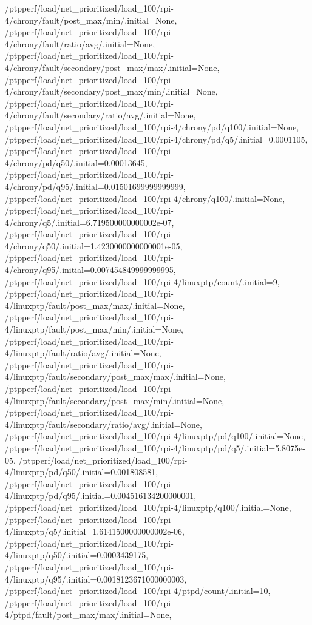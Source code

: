 {    /ptpperf/load/net_prioritized/load_100/rpi-4/chrony/fault/post_max/min/.initial=None,
    /ptpperf/load/net_prioritized/load_100/rpi-4/chrony/fault/ratio/avg/.initial=None,
    /ptpperf/load/net_prioritized/load_100/rpi-4/chrony/fault/secondary/post_max/max/.initial=None,
    /ptpperf/load/net_prioritized/load_100/rpi-4/chrony/fault/secondary/post_max/min/.initial=None,
    /ptpperf/load/net_prioritized/load_100/rpi-4/chrony/fault/secondary/ratio/avg/.initial=None,
    /ptpperf/load/net_prioritized/load_100/rpi-4/chrony/pd/q100/.initial=None,
    /ptpperf/load/net_prioritized/load_100/rpi-4/chrony/pd/q5/.initial=0.0001105,
    /ptpperf/load/net_prioritized/load_100/rpi-4/chrony/pd/q50/.initial=0.00013645,
    /ptpperf/load/net_prioritized/load_100/rpi-4/chrony/pd/q95/.initial=0.01501699999999999,
    /ptpperf/load/net_prioritized/load_100/rpi-4/chrony/q100/.initial=None,
    /ptpperf/load/net_prioritized/load_100/rpi-4/chrony/q5/.initial=6.719500000000002e-07,
    /ptpperf/load/net_prioritized/load_100/rpi-4/chrony/q50/.initial=1.4230000000000001e-05,
    /ptpperf/load/net_prioritized/load_100/rpi-4/chrony/q95/.initial=0.007454849999999995,
    /ptpperf/load/net_prioritized/load_100/rpi-4/linuxptp/count/.initial=9,
    /ptpperf/load/net_prioritized/load_100/rpi-4/linuxptp/fault/post_max/max/.initial=None,
    /ptpperf/load/net_prioritized/load_100/rpi-4/linuxptp/fault/post_max/min/.initial=None,
    /ptpperf/load/net_prioritized/load_100/rpi-4/linuxptp/fault/ratio/avg/.initial=None,
    /ptpperf/load/net_prioritized/load_100/rpi-4/linuxptp/fault/secondary/post_max/max/.initial=None,
    /ptpperf/load/net_prioritized/load_100/rpi-4/linuxptp/fault/secondary/post_max/min/.initial=None,
    /ptpperf/load/net_prioritized/load_100/rpi-4/linuxptp/fault/secondary/ratio/avg/.initial=None,
    /ptpperf/load/net_prioritized/load_100/rpi-4/linuxptp/pd/q100/.initial=None,
    /ptpperf/load/net_prioritized/load_100/rpi-4/linuxptp/pd/q5/.initial=5.8075e-05,
    /ptpperf/load/net_prioritized/load_100/rpi-4/linuxptp/pd/q50/.initial=0.001808581,
    /ptpperf/load/net_prioritized/load_100/rpi-4/linuxptp/pd/q95/.initial=0.004516134200000001,
    /ptpperf/load/net_prioritized/load_100/rpi-4/linuxptp/q100/.initial=None,
    /ptpperf/load/net_prioritized/load_100/rpi-4/linuxptp/q5/.initial=1.6141500000000002e-06,
    /ptpperf/load/net_prioritized/load_100/rpi-4/linuxptp/q50/.initial=0.0003439175,
    /ptpperf/load/net_prioritized/load_100/rpi-4/linuxptp/q95/.initial=0.0018123671000000003,
    /ptpperf/load/net_prioritized/load_100/rpi-4/ptpd/count/.initial=10,
    /ptpperf/load/net_prioritized/load_100/rpi-4/ptpd/fault/post_max/max/.initial=None,
}
